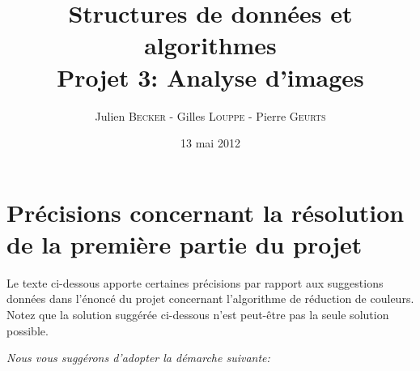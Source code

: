 \documentclass[a4paper,10pt]{article}
\title{
    \textbf{Structures de données et algorithmes}\\
    Projet 3: Analyse d'images
}
\author{Julien \textsc{Becker} - Gilles \textsc{Louppe} - Pierre \textsc{Geurts}}
\date{13 mai 2012}
\begin{document}
\maketitle

\section*{Précisions concernant la résolution de la première partie du projet}

Le texte ci-dessous apporte certaines précisions par rapport aux
suggestions données dans l'énoncé du projet concernant l'algorithme de
réduction de couleurs. Notez que la solution suggérée ci-dessous n'est
peut-être pas la seule solution possible.

\bigskip

{\it Nous vous suggérons d'adopter la démarche suivante:}
\end{document}
